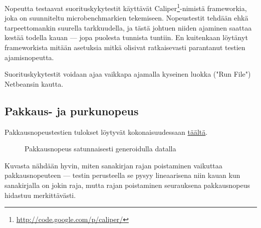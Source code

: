 \documentclass{article}
\begin{document}
Nopeutta testaavat suorituskykytestit käyttävät Caliper\footnote{\url{http://code.google.com/p/caliper/}}-nimistä frameworkia, joka on suunniteltu microbenchmarkien tekemiseen. Nopeustestit tehdään ehkä tarpeettomankin suurella tarkkuudella, ja tästä johtuen niiden ajaminen saattaa kestää todella kauan --- jopa puolesta tunnista tuntiin. En kuitenkaan löytänyt frameworkista mitään asetuksia mitkä olisivat ratkaisevasti parantanut testien ajamisnopeutta.

Suorituskykytestit voidaan ajaa vaikkapa ajamalla kyseinen luokka ("Run File") Netbeansin kautta.

\subsection{Pakkaus- ja purkunopeus}
Pakkausnopeustestien tulokset löytyvät kokonaisuudessaan \href{http://microbenchmarks.appspot.com/run/kauhsa@viuhka.fi/kauhsa.compression.lzw.benchmarks.PerformanceBenchmark}{täältä}.

\begin{figure}[h]
\centering
{}
\caption{Pakkausnopeus satunnaisesti generoidulla datalla}
\end{figure}

Kuvasta nähdään hyvin, miten sanakirjan rajan poistaminen vaikuttaa pakkausnopeuteen --- testin perusteella se pysyy lineaarisena niin kauan kun sanakirjalla on jokin raja, mutta rajan poistaminen seurauksena pakkausnopeus hidastuu merkittävästi.
\end{document}
